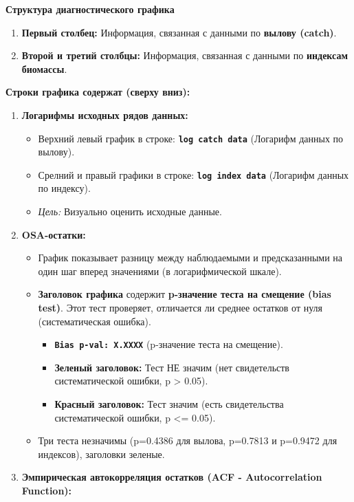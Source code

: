 \documentclass[
  letterpaper,
  DIV=11,
  numbers=noendperiod]{scrreprt}
\begin{document}
\textbf{Структура диагностического графика}

\begin{enumerate}
\def\labelenumi{\arabic{enumi}.}
\item
  \textbf{Первый столбец:} Информация, связанная с данными по
  \textbf{вылову (catch)}.
\item
  \textbf{Второй и третий столбцы:} Информация, связанная с данными по
  \textbf{индексам биомассы}.
\end{enumerate}

\textbf{Строки графика содержат (сверху вниз):}

\begin{enumerate}
\def\labelenumi{\arabic{enumi}.}
\item
  \textbf{Логарифмы исходных рядов данных:}

  \begin{itemize}
  \item
    Верхний левый график в строке: \textbf{\texttt{log\ catch\ data}}
    (Логарифм данных по вылову).
  \item
    Срелний и правый графики в строке:
    \textbf{\texttt{log\ index\ data}} (Логарифм данных по индексу).
  \item
    \emph{Цель:} Визуально оценить исходные данные.
  \end{itemize}
\item
  \textbf{OSA-остатки:}

  \begin{itemize}
  \item
    График показывает разницу между наблюдаемыми и предсказанными на
    один шаг вперед значениями (в логарифмической шкале).
  \item
    \textbf{Заголовок графика} содержит \textbf{p-значение теста на
    смещение (bias test)}. Этот тест проверяет, отличается ли среднее
    остатков от нуля (систематическая ошибка).

    \begin{itemize}
    \item
      \textbf{\texttt{Bias\ p-val:\ X.XXXX}} (p-значение теста на
      смещение).
    \item
      \textbf{Зеленый заголовок:} Тест НЕ значим (нет свидетельств
      систематической ошибки, p \textgreater{} 0.05).
    \item
      \textbf{Красный заголовок:} Тест значим (есть свидетельства
      систематической ошибки, p \textless= 0.05).
    \end{itemize}
  \item
    Три теста незначимы (p=0.4386 для вылова, p=0.7813 и p=0.9472 для
    индексов), заголовки зеленые.
  \end{itemize}
\item
  \textbf{Эмпирическая автокорреляция остатков (ACF - Autocorrelation
  Function):}


\end{enumerate}
\end{document}
